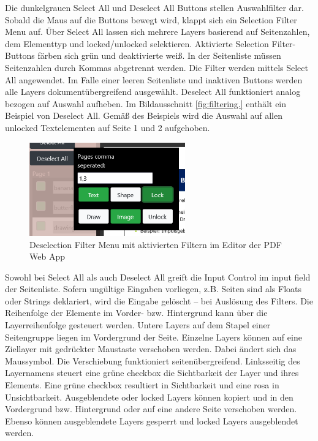Die dunkelgrauen Select All und Deselect All Buttons stellen Auswahlfilter dar. Sobald die Maus auf die Buttons bewegt wird, klappt sich ein Selection Filter Menu auf. Über Select All lassen sich mehrere Layers basierend auf Seitenzahlen, dem Elementtyp und locked/unlocked selektieren. Aktivierte Selection Filter-Buttons färben sich grün und deaktivierte weiß. In der Seitenliste müssen Seitenzahlen durch Kommas abgetrennt werden. Die Filter werden mittels Select All angewendet. Im Falle einer leeren Seitenliste und inaktiven Buttons werden alle Layers dokumentübergreifend ausgewählt. Deselect All funktioniert analog bezogen auf Auswahl aufheben. Im Bildausschnitt \ref{fig:filtering.} enthält ein Beispiel von Deselect All. Gemäß des Beispiels wird die Auswahl auf allen unlocked Textelementen auf Seite 1 und 2 aufgehoben. 

\begin{figure}[!htbp]
	\centering
	\includegraphics[width=0.6\textwidth]{"images/filtering.png"}
	\caption{Deselection Filter Menu mit aktivierten Filtern im Editor der PDF Web App}
	\label{fig:filtering}
\end{figure}

Sowohl bei Select All als auch Deselect All greift die Input Control im input field der Seitenliste. Sofern ungültige Eingaben vorliegen, z.B. Seiten sind als Floats oder Strings deklariert, wird die Eingabe gelöscht – bei Auslösung des Filters. Die Reihenfolge der Elemente im Vorder- bzw. Hintergrund kann über die Layerreihenfolge gesteuert werden. Untere Layers auf dem Stapel einer Seitengruppe liegen im Vordergrund der Seite. Einzelne Layers können auf eine Ziellayer mit gedrückter Maustaste verschoben werden. Dabei ändert sich das Maussymbol. Die Verschiebung funktioniert seitenübergreifend. Linksseitig des Layernamens steuert eine grüne checkbox die Sichtbarkeit der Layer und ihres Elements. Eine grüne checkbox resultiert in Sichtbarkeit und eine rosa in Unsichtbarkeit. Ausgeblendete oder locked Layers können kopiert und in den Vordergrund bzw. Hintergrund oder auf eine andere Seite verschoben werden. Ebenso können ausgeblendete Layers gesperrt und locked Layers ausgeblendet werden.

